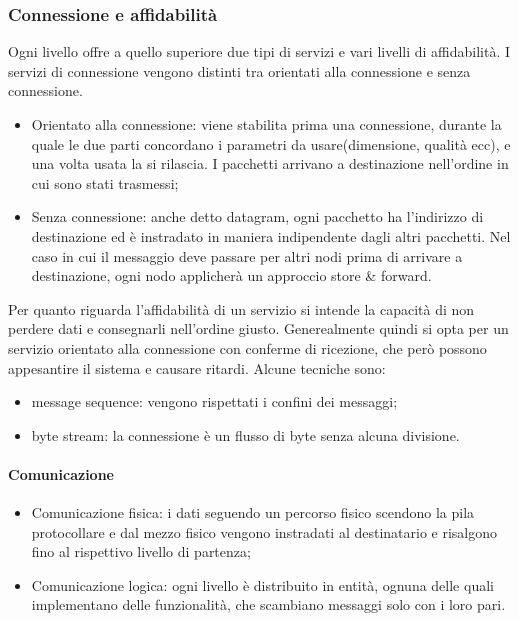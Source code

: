 \documentclass{subfiles}
\begin{document}
\subsubsection{Connessione e affidabilità}
        Ogni livello offre a quello superiore due tipi di servizi e vari livelli di affidabilità. I servizi di connessione vengono 
        distinti tra orientati alla connessione e senza connessione.
    \begin{itemize}
        \item Orientato alla connessione: viene stabilita prima una connessione, durante la quale le due parti concordano i parametri da 
        usare(dimensione, qualità ecc), e una volta usata la si rilascia. I pacchetti arrivano a destinazione nell'ordine in cui sono 
        stati trasmessi;
        \item Senza connessione: anche detto datagram, ogni pacchetto ha l'indirizzo di destinazione ed è instradato in maniera 
        indipendente dagli altri pacchetti. Nel caso in cui il messaggio deve passare per altri nodi prima di arrivare a destinazione, 
        ogni nodo applicherà un approccio store \& forward.
    \end{itemize}
    Per quanto riguarda l'affidabilità di un servizio si intende la capacità di non perdere dati e consegnarli nell'ordine giusto. 
    Generealmente quindi si opta per un servizio orientato alla connessione con conferme di ricezione, che però possono appesantire 
    il sistema e causare ritardi. Alcune tecniche sono:
    \begin{itemize}
        \item message sequence: vengono rispettati i confini dei messaggi;
        \item byte stream: la connessione è un flusso di byte senza alcuna divisione.
    \end{itemize}

    \paragraph{Comunicazione}
    \begin{itemize}
        \item Comunicazione fisica: i dati seguendo un percorso fisico scendono la pila protocollare e dal mezzo fisico vengono 
        instradati al destinatario e risalgono fino al rispettivo livello di partenza;
        \item Comunicazione logica: ogni livello è distribuito in entità, ognuna delle quali implementano delle funzionalità, che 
        scambiano messaggi solo con i loro pari.
    \end{itemize}
\end{document}
